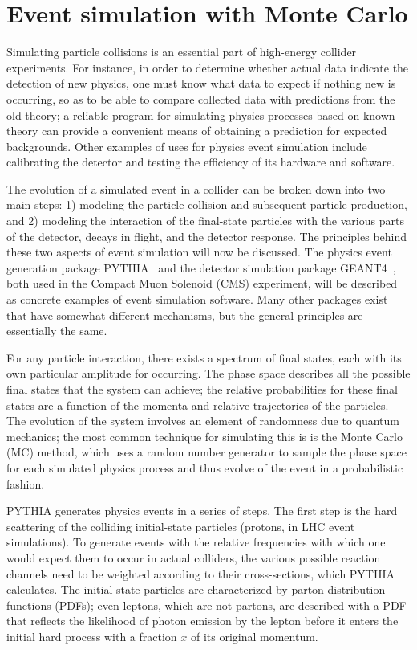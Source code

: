 \section{Event simulation with Monte Carlo\label{sec:cms-sim}}

Simulating particle collisions is an essential part of high-energy collider experiments. For instance, in order to determine whether actual data indicate the detection of new physics, one must know what data to expect if nothing new is occurring, so as to be able to compare collected data with predictions from the old theory; a reliable program for simulating physics processes based on known theory can provide a convenient means of obtaining a prediction for expected backgrounds. Other examples of uses for physics event simulation include calibrating the detector and testing the efficiency of its hardware and software.

The evolution of a simulated event in a collider can be broken down into two main steps: 1) modeling the particle collision and subsequent particle production, and 2) modeling the interaction of the final-state particles with the various parts of the detector, decays in flight, and the detector response. The principles behind these two aspects of event simulation will now be discussed. The physics event generation package PYTHIA~\cite{Sjostrand:2006za} and the detector simulation package GEANT4~\cite{documents:998155}, both used in the Compact Muon Solenoid (CMS) experiment, will be described as concrete examples of event simulation software. Many other packages exist that have somewhat different mechanisms, but the general principles are essentially the same.

For any particle interaction, there exists a spectrum of final states, each with its own particular amplitude for occurring. The phase space describes all the possible final states that the system can achieve; the relative probabilities for these final states are a function of the momenta and relative trajectories of the particles. The evolution of the system involves an element of randomness due to quantum mechanics; the most common technique for simulating this is is the Monte Carlo (MC) method, which uses a random number generator to sample the phase space for each simulated physics process and thus evolve of the event in a probabilistic fashion.

PYTHIA generates physics events in a series of steps. The first step is the hard scattering of the colliding initial-state particles (protons, in LHC event simulations). To generate events with the relative frequencies with which one would expect them to occur in actual colliders, the various possible reaction channels need to be weighted according to their cross-sections, which PYTHIA calculates. The initial-state particles are characterized by parton distribution functions (PDFs); even leptons, which are not partons, are described with a PDF that reflects the likelihood of photon emission by the lepton before it enters the initial hard process with a fraction $x$ of its original momentum.

